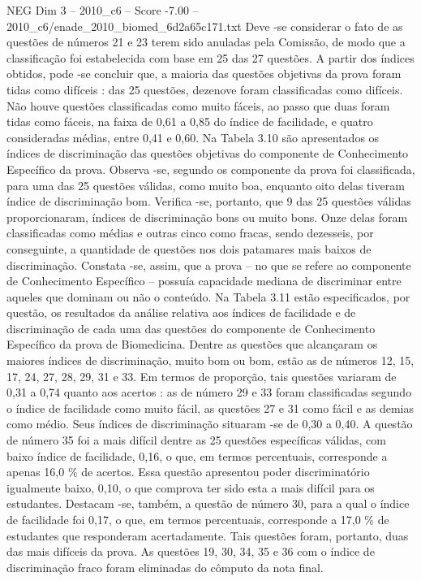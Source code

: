 \begin{textsample}{NEG Dim 3 – 2010\_c6 – Score -7.00 – 2010\_c6/enade\_2010\_biomed\_6d2a65c171.txt}
Deve -se considerar o fato de as questões de números 21 e 23 terem sido anuladas pela Comissão, de modo que a classificação foi estabelecida com base em 25 das 27 questões.
A partir dos índices obtidos, pode -se concluir que, a maioria das questões objetivas da prova foram tidas como difíceis : das 25 questões, dezenove foram classificadas como difíceis.
Não houve questões classificadas como muito fáceis, ao passo que duas foram tidas como fáceis, na faixa de 0,61 a 0,85 do índice de facilidade, e quatro consideradas médias, entre 0,41 e 0,60.
Na Tabela 3.10 são apresentados os índices de discriminação das questões objetivas do componente de Conhecimento Específico da prova.
Observa -se, segundo os componente da prova foi classificada, para uma das 25 questões válidas, como muito boa, enquanto oito delas tiveram índice de discriminação bom.
Verifica -se, portanto, que 9 das 25 questões válidas proporcionaram, índices de discriminação bons ou muito bons.
Onze delas foram classificadas como médias e outras cinco como fracas, sendo dezesseis, por conseguinte, a quantidade de questões nos dois patamares mais baixos de discriminação.
Constata -se, assim, que a prova – no que se refere ao componente de Conhecimento Específico – possuía capacidade mediana de discriminar entre aqueles que dominam ou não o conteúdo.
Na Tabela 3.11 estão especificados, por questão, os resultados da análise relativa aos índices de facilidade e de discriminação de cada uma das questões do componente de Conhecimento Específico da prova de Biomedicina.
Dentre as questões que alcançaram os maiores índices de discriminação, muito bom ou bom, estão as de números 12, 15, 17, 24, 27, 28, 29, 31 e 33.
Em termos de proporção, tais questões variaram de 0,31 a 0,74 quanto aos acertos : as de número 29 e 33 foram classificadas segundo o índice de facilidade como muito fácil, as questões 27 e 31 como fácil e as demias como médio.
Seus índices de discriminação situaram -se de 0,30 a 0,40.
A questão de número 35 foi a mais difícil dentre as 25 questões específicas válidas, com baixo índice de facilidade, 0,16, o que, em termos percentuais, corresponde a apenas 16,0 \% de acertos.
Essa questão apresentou poder discriminatório igualmente baixo, 0,10, o que comprova ter sido esta a mais difícil para os estudantes.
Destacam -se, também, a questão de número 30, para a qual o índice de facilidade foi 0,17, o que, em termos percentuais, corresponde a 17,0 \% de estudantes que responderam acertadamente.
Tais questões foram, portanto, duas das mais difíceis da prova.
As questões 19, 30, 34, 35 e 36 com o índice de discriminação fraco foram eliminadas do cômputo da nota final.

\end{textsample}
